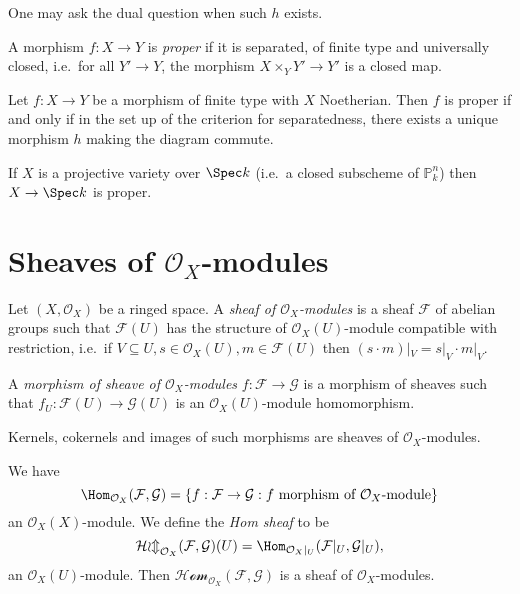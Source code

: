 \documentclass[a4paper]{article}
\renewcommand*{\P}{\mathbb{P}}
\newcommand{\sh}[1]{\mathcal{#1}} %
\begin{document}
One may ask the dual question when such \(h\) exists.

\begin{definition}
  A morphism \(f: X \to Y\) is \emph{proper} if it is separated, of finite type and universally closed, i.e.\ for all \(Y' \to Y\), the morphism \(X \times_Y Y' \to Y'\) is a closed map.
\end{definition}

\begin{proposition}
   Let \(f: X \to Y\) be a morphism of finite type with \(X\) Noetherian. Then \(f\) is proper if and only if in the set up of the criterion for separatedness, there exists a unique morphism \(h\) making the diagram commute.
\end{proposition}

\begin{eg}
  If \(X\) is a projective variety over \(\Spec k\) (i.e.\ a closed subscheme of \(\P_k^n\)) then \(X \to \Spec k\) is proper.
\end{eg}

\section{Sheaves of \(\sh O_X\)-modules}

\begin{definition}
  Let \((X, \sh O_X)\) be a ringed space. A \emph{sheaf of \(\sh O_X\)-modules} is a sheaf \(\sh F\) of abelian groups such that \(\sh F(U)\) has the structure of \(\sh O_X(U)\)-module compatible with restriction, i.e.\ if \(V \subseteq U, s \in \sh O_X(U), m \in \sh F(U)\) then \((s \cdot m)|_V = s|_V \cdot m|_V\).

  A \emph{morphism of sheave of \(\sh O_X\)-modules} \(f: \sh F \to \sh G\) is a morphism of sheaves such that \(f_U: \sh F(U) \to \sh G(U)\) is an \(\sh O_X(U)\)-module homomorphism.
\end{definition}

Kernels, cokernels and images of such morphisms are sheaves of \(\sh O_X\)-modules.

We have
\[
  \Hom_{\sh O_X}(\sh F, \sh G) = \{f: \sh F \to \sh G: f \text{ morphism of }\sh O_X\text{-module}\}
\]
an \(\sh O_X(X)\)-module. We define the \emph{Hom sheaf} to be
\[
  \sh{Hom}_{\sh O_X}(\sh F, \sh G)(U) = \Hom_{\sh O_X|_U}(\sh F|_U, \sh G|_U),
\]
an \(\sh O_X(U)\)-module. Then \(\sh{Hom}_{\sh O_X}(\sh F, \sh G)\) is a sheaf of \(\sh O_X\)-modules.
\end{document}
